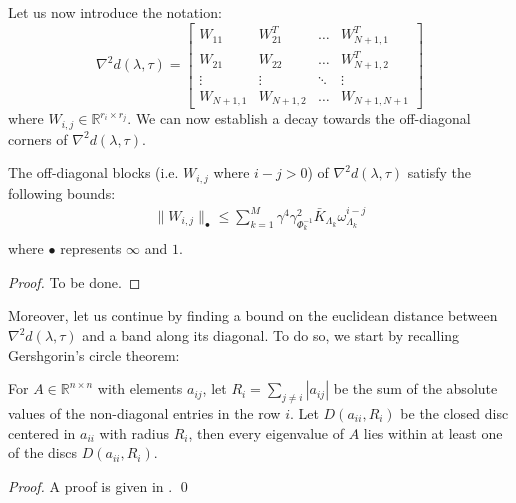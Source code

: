 Let us now introduce the notation:
\begin{equation}
\nabla^2 d(\lambda, \tau) = \left[ \begin{array}{cccc}
W_{11} & W_{21}^T & \hdots & W_{N+1,1}^T \\
W_{21} & W_{22} & \hdots & W_{N+1,2}^T \\
\vdots & \vdots  & \ddots & \vdots \\
W_{N+1,1} & W_{N+1,2} & \hdots & W_{N+1,N+1}
\end{array} \right]
\end{equation}
where $W_{i,j} \in \mathbb{R}^{r_i \times r_j}$. We can now establish a decay towards the off-diagonal corners of $\nabla^2 d(\lambda, \tau)$.

\begin{proposition} \label{p:DecayHessian}
The off-diagonal blocks (i.e. $W_{i,j}$ where $i - j > 0$) of $\nabla^2 d(\lambda, \tau)$ satisfy the following bounds:
\begin{subequations}
\begin{align}
\| W_{i,j} \|_\bullet \leq \sum_{k=1}^M \gamma^4 \gamma_{\Phi_k^{-1}}^2 \bar{K}_{\Lambda_k} \omega_{\Lambda_k}^{i-j} \\
\end{align}
\end{subequations}
where $\bullet$ represents $\infty$ and $1$.
\end{proposition}
\begin{proof}
To be done.
\end{proof}

Moreover, let us continue by finding a bound on the euclidean distance between $\nabla^2 d(\lambda, \tau)$ and a band along its diagonal. To do so, we start by recalling Gershgorin's circle theorem:
\begin{theorem} \label{l:Gerschgorin}
For $A \in \mathbb{R}^{n \times n}$ with elements $a_{ij}$, let $R_i = \sum_{j \neq i} | a_{ij} |$ be the sum of the absolute values of the non-diagonal entries in the row $i$. Let $D(a_{ii},R_i)$ be the closed disc centered in $a_{ii}$ with radius $R_i$, then every eigenvalue of $A$ lies within at least one of the discs $D(a_{ii}, R_i)$.
\end{theorem}
\begin{proof}
A proof is given in \cite{}.
\qed
\end{proof}

